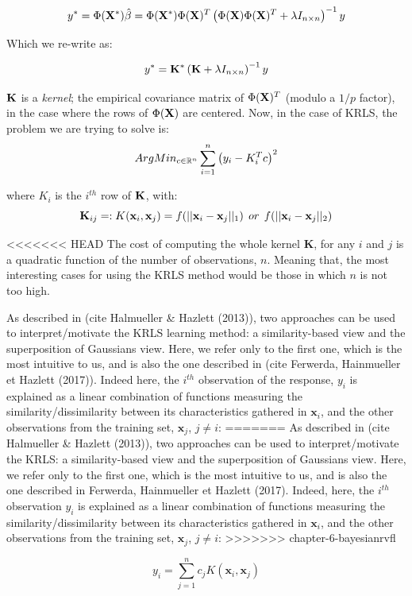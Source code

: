 $$
y^* = \Phi({\bf X^*})\hat{\beta} = \Phi({\bf X^*})\Phi({\bf X})^T \left( \Phi({\bf X})\Phi({\bf X})^T + \lambda I_{n \times n} \right)^{-1} y
$$

Which we re-write as:

$$
y^* =  {\bf K^*} \left( {\bf K} + \lambda I_{n \times n} \right)^{-1} y
$$

${\bf K}$ is a {\it kernel}; the empirical covariance matrix of $\Phi({\bf X})^T$ (modulo a $1/p$ factor), in the case where the rows of $\Phi({\bf X})$ are centered. Now, in the case of KRLS, the problem we are trying to solve is:
$$
ArgMin_{c \in \mathbb{R}^n} \sum_{i = 1}^n \left( y_i - K_i^T c \right)^2
$$

where $K_i$ is the $i^{th}$ row of ${\bf K}$, with:
$$
{\bf K}_{ij} =: K(\textbf{x}_i, \textbf{x}_j) = f(||\textbf{x}_i - \textbf{x}_j||_1) \: \: or \: \: f(||\textbf{x}_i - \textbf{x}_j||_2)
$$

<<<<<<< HEAD
The cost of computing the whole kernel {\bf K}, for any $i$ and $j$ is a quadratic function of the number of observations, $n$. Meaning that, the most interesting cases for using the KRLS method would be those in which $n$ is not too high.

As described in (cite Halmueller \& Hazlett (2013)), two approaches can be used to interpret/motivate the KRLS learning method: a similarity-based view and the superposition of Gaussians view. Here, we refer only to the first one, which is the most intuitive to us, and is also the one described in (cite Ferwerda, Hainmueller et Hazlett (2017)). Indeed here, the $i^{th}$ observation of the response, $y_i$ is explained as a linear combination of functions measuring the similarity/dissimilarity between its characteristics gathered in $\textbf{x}_i$, and the other observations from the training set, $\textbf{x}_j$, $j \neq i$:
=======
As described in (cite Halmueller \& Hazlett (2013)), two approaches can be used to interpret/motivate the KRLS: a similarity-based view and the superposition of Gaussians view. Here, we refer only to the first one, which is the most intuitive to us, and is also the one described in Ferwerda, Hainmueller et Hazlett (2017). Indeed, here, the $i^{th}$ observation $y_i$ is explained as a linear combination of functions measuring the similarity/dissimilarity between its characteristics gathered in $\textbf{x}_i$, and the other observations from the training set, $\textbf{x}_j$, $j \neq i$:
>>>>>>> chapter-6-bayesianrvfl

\begin{equation}
\label{eq:comblinresponse}
y_i = \sum_{j = 1}^n c_j K(\textbf{x}_i, \textbf{x}_j)
\end{equation}

